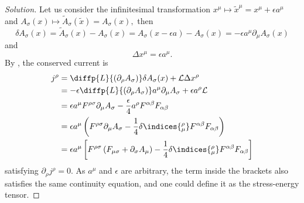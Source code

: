 \begin{proof}[Solution]
    Let us consider the infinitesimal transformation \(x^\mu \mapsto \tilde{x}^\mu = x^\mu + \epsilon a^\mu\) and \(A_\sigma(x) \mapsto \tilde{A}_\sigma(\tilde{x}) = A_\sigma(x),\) then
    \begin{equation*}
        \delta A_\sigma(x) = \tilde{A}_\sigma(x) - A_\sigma(x) = A_\sigma(x - \epsilon a) - A_\sigma(x) = - \epsilon a^\mu \partial_\mu A_\sigma(x)
    \end{equation*}
    and
    \begin{equation*}
        \Delta x^\mu = \epsilon a^\mu.
    \end{equation*}
    By , the conserved current is
    \begin{align*}
        j^\rho &= \diffp{L}{(\partial_\rho A_\sigma)} \delta A_\sigma(x) + \mathcal{L} \Delta x^\rho\\
               &= - \epsilon \diffp{L}{(\partial_\rho A_\sigma)} a^\mu \partial_\mu A_\sigma + \epsilon a^\rho \mathcal{L}\\
               &= \epsilon a^\mu F^{\rho \sigma} \partial_\mu A_\sigma - \frac\epsilon4 a^\rho F^{\alpha \beta}F_{\alpha \beta}\\
               &= \epsilon a^\mu \left(F^{\rho \sigma} \partial_\mu A_\sigma - \frac14 \delta\indices{^\rho_\mu} F^{\alpha \beta} F_{\alpha \beta}\right)\\
               &= \epsilon a^\mu \left[F^{\rho \sigma} \left(F_{\mu \sigma} + \partial_\sigma A_\mu\right) - \frac14 \delta\indices{^\rho_\mu} F^{\alpha \beta}F_{\alpha \beta}\right]
    \end{align*}
    satisfying \(\partial_\rho j^\rho = 0.\) As \(a^\mu\) and \(\epsilon\) are arbitrary, the term inside the brackets also satisfies the same continuity equation, and one could define it as the stress-energy tensor. 


\end{proof}
